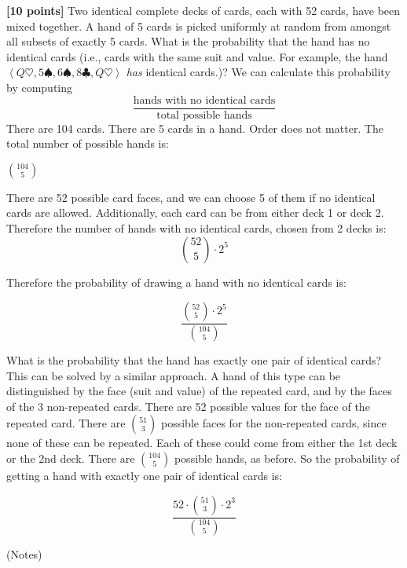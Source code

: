 \documentclass[12pt,oneside]{article}
\begin{document}
\begin{problem} %
{\bf [10 points]}
Two identical complete decks of cards, each with 52 cards, have been mixed together. A hand of 5 cards is picked uniformly at random from amongst all subsets of exactly 5 cards.
\bparts
\ppart {\bf [5 points]} What is the probability that the hand has no identical cards (i.e., cards with the same suit and value. For example, the hand {$\left<Q\heartsuit, 5\spadesuit, 6\spadesuit, 8\clubsuit, Q\heartsuit\right>$} {\em has} identical cards.)?
\vspace{.15in}
We can calculate this probability by computing
%
\[
\frac{\text{hands with no identical cards}}{\text{total possible hands}}
\]
%
There are 104 cards.  There are 5 cards in a hand.  Order does not matter.  The total number of possible hands is:

$\binom{104}{5}$

There are 52 possible card faces, and we can choose 5 of them if no identical cards are allowed.  Additionally, each card can be from either deck 1 or deck 2.  Therefore the number of hands with no identical cards, chosen from 2 decks is:
%
\[
\binom{52}{5} \cdot 2^5
\]
%

Therefore the probability of drawing a hand with no identical cards is:

%
\[
\frac{\binom{52}{5} \cdot 2^5}{\binom{104}{5}}
\]
%

\ppart {\bf [5 points]} What is the probability that the hand has exactly one pair of identical cards?
\vspace{.15in}
This can be solved by a similar approach.  A hand of this type can be distinguished by the face (suit and value) of the repeated card, and by the faces of the 3 non-repeated cards.  There are 52 possible values for the face of the repeated card.  There are $\binom{51}{3}$ possible faces for the non-repeated cards, since none of these can be repeated.  Each of these could come from either the 1st deck or the 2nd deck.  There are  $\binom{104}{5}$ possible hands, as before.  So the probability of getting a hand with exactly one pair of identical cards is:

%
\[
\frac{52 \cdot \binom{51}{3} \cdot 2^3}{\binom{104}{5}}
\]
%

\eparts
\end{problem}

\newpage

\newpage
\begin{center}
(Notes)
\end{center}

\newpage

\mbox{}

\newpage

\mbox{}
\end{document}
